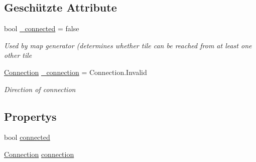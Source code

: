 \subsection*{Geschützte Attribute}
\begin{DoxyCompactItemize}
\item 
bool \hyperlink{class_gruppe22_1_1_backend_1_1_generator_tile_ada6c954a36d01b4d1df4bb616df9d3fb}{\-\_\-connected} = false
\begin{DoxyCompactList}\small\item\em Used by map generator (determines whether tile can be reached from at least one other tile \end{DoxyCompactList}\item 
\hyperlink{namespace_gruppe22_1_1_backend_a74373668761d179b11ba50e5980a8674}{Connection} \hyperlink{class_gruppe22_1_1_backend_1_1_generator_tile_ac32f05dfbc85524404f187d9235ae982}{\-\_\-connection} = Connection.\-Invalid
\begin{DoxyCompactList}\small\item\em Direction of connection \end{DoxyCompactList}\end{DoxyCompactItemize}
\subsection*{Propertys}
\begin{DoxyCompactItemize}
\item 
bool \hyperlink{class_gruppe22_1_1_backend_1_1_generator_tile_aa2f02c266ad7b74d788e669c9478d445}{connected}
\item 
\hyperlink{namespace_gruppe22_1_1_backend_a74373668761d179b11ba50e5980a8674}{Connection} \hyperlink{class_gruppe22_1_1_backend_1_1_generator_tile_aae87ad2fa7e0b2903c73b2cd939b3637}{connection}
\end{DoxyCompactItemize}


